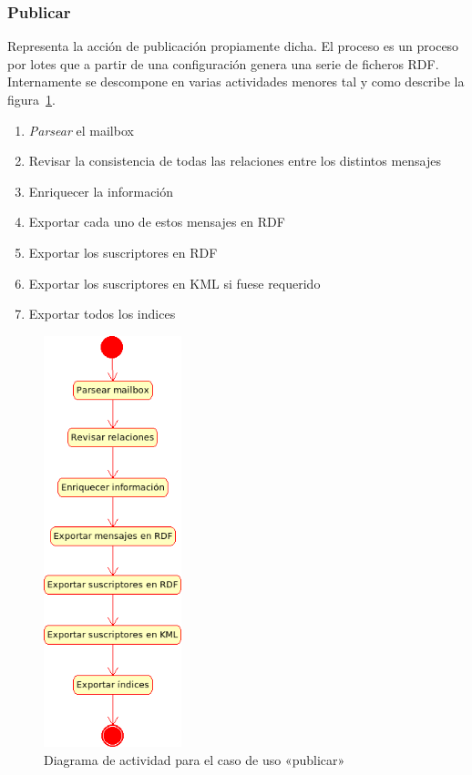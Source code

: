\subsubsection{Publicar}

Representa la acción de publicación propiamente dicha. El proceso es un proceso por 
lotes que a partir de una configuración genera una serie de ficheros RDF. Internamente
se descompone en varias actividades menores tal y como describe la 
figura~\ref{fig:uml:publicar}.

\begin{enumerate}
 \item \emph{Parsear} el mailbox
 \item Revisar la consistencia de todas las relaciones entre los distintos mensajes
 \item Enriquecer la información
 \item Exportar cada uno de estos mensajes en RDF
 \item Exportar los suscriptores en RDF
 \item Exportar los suscriptores en KML si fuese requerido
 \item Exportar todos los indices
\end{enumerate}

\begin{figure}[ht]
 	\centering
	\includegraphics[width=4cm]{images/uml/casos-uso/publicar.png}
	\caption{Diagrama de actividad para el caso de uso «publicar»}
	\label{fig:uml:publicar}
\end{figure}

